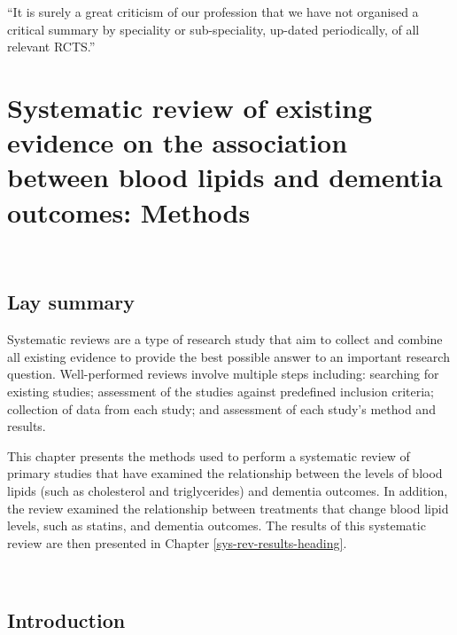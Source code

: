 \documentclass[a4paper, twoside]{templates/ociamthesis}
\begin{document}
\begin{savequote}
``It is surely a great criticism of our profession that we have not
organised a critical summary by speciality or sub-speciality, up-dated
periodically, of all relevant RCTS.''
\end{savequote}



\hypertarget{sys-rev-methods-heading}{%
\chapter{Systematic review of existing evidence on the association between blood lipids and dementia outcomes: Methods}\label{sys-rev-methods-heading}}

~

\minitoc 

\begin{laybox}

\hypertarget{lay-summary-2}{%
\section*{Lay summary}\label{lay-summary-2}}

Systematic reviews are a type of research study that aim to collect and combine all existing evidence to provide the best possible answer to an important research question. Well-performed reviews involve multiple steps including: searching for existing studies; assessment of the studies against predefined inclusion criteria; collection of data from each study; and assessment of each study's method and results.
~

This chapter presents the methods used to perform a systematic review of primary studies that have examined the relationship between the levels of blood lipids (such as cholesterol and triglycerides) and dementia outcomes. In addition, the review examined the relationship between treatments that change blood lipid levels, such as statins, and dementia outcomes. The results of this systematic review are then presented in Chapter \ref{sys-rev-results-heading}.

\end{laybox}

~

\hypertarget{sys-rev-intro}{%
\section{Introduction}\label{sys-rev-intro}}
\end{document}
